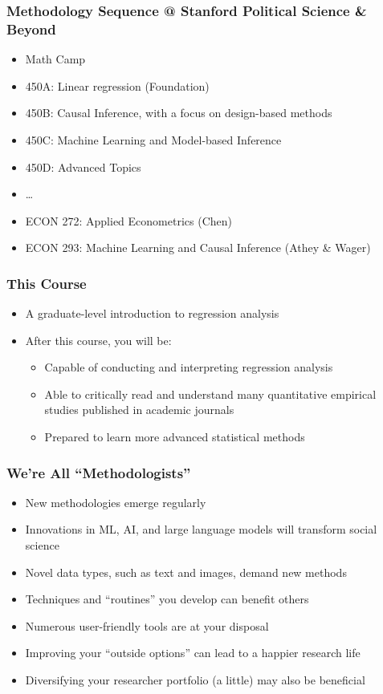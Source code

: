\documentclass[xcolor=svgnames,9pt,english,aspectratio=169,t]{beamer}
\newif\ifrelease
\begin{document}
\begin{frame}
  \frametitle{Methodology Sequence @ Stanford Political Science \& Beyond}
\vspace{-.25\baselineskip}\pause
\begin{itemize}\itemsep0.8em
\item Math Camp\pause
\item 450A: Linear regression (Foundation)\pause
\item 450B: Causal Inference, with a focus on design-based methods\pause
\item 450C: Machine Learning and Model-based Inference\pause
\item 450D: Advanced Topics\pause
\item[] \ldots\pause
\item ECON 272: Applied Econometrics\ifrelease\else{} (Chen)\fi
\item ECON 293: Machine Learning and Causal Inference\ifrelease\else{} (Athey \& Wager)\fi
\end{itemize}
\end{frame}

\begin{frame}
\frametitle{This Course}
\begin{itemize}
\item A graduate-level introduction to regression analysis \pause
\bigskip
\item After this course, you will be: \pause
  \begin{itemize}
  \item Capable of conducting and interpreting regression analysis\bigskip \pause
  \item Able to critically read and understand many
  quantitative empirical studies published in academic journals\bigskip \pause
  \item Prepared to learn more advanced statistical methods
  \end{itemize}
\end{itemize}
\end{frame}

\begin{frame}
\frametitle{We're All ``Methodologists''}
\begin{itemize}\itemsep0.5em
\item New methodologies emerge regularly
\item Innovations in ML, AI, and large language models will transform social science
\item Novel data types, such as text and images, demand new methods
\item Techniques and ``routines'' you develop can benefit others
\item Numerous user-friendly tools are at your disposal
\item Improving your ``outside options'' can lead to a happier research life
\item Diversifying your researcher portfolio (a little) may also be beneficial
\end{itemize}
\end{frame}
\end{document}
